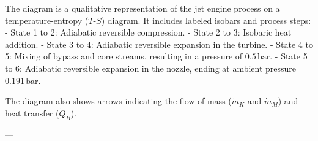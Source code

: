 The diagram is a qualitative representation of the jet engine process on a temperature-entropy (\( T \)-\( S \)) diagram. It includes labeled isobars and process steps:  
- State 1 to 2: Adiabatic reversible compression.  
- State 2 to 3: Isobaric heat addition.  
- State 3 to 4: Adiabatic reversible expansion in the turbine.  
- State 4 to 5: Mixing of bypass and core streams, resulting in a pressure of \( 0.5 \, \text{bar} \).  
- State 5 to 6: Adiabatic reversible expansion in the nozzle, ending at ambient pressure \( 0.191 \, \text{bar} \).  

The diagram also shows arrows indicating the flow of mass (\( \dot{m}_K \) and \( \dot{m}_M \)) and heat transfer (\( \dot{Q}_B \)).  

---
